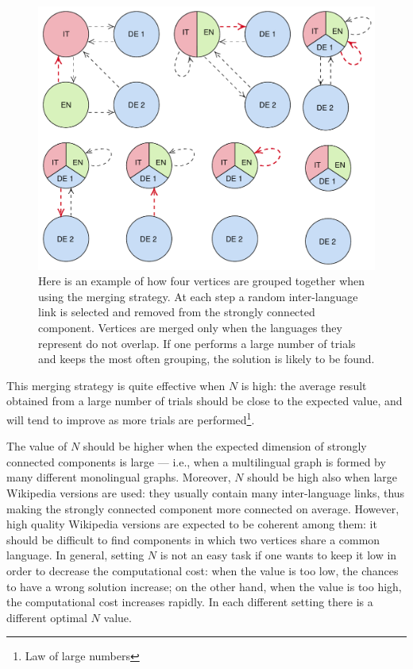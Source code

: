                 \begin{figure}
                    \centering
                    \includegraphics[width=\textwidth]{images/scc_random.pdf}
                    \caption{Here is an example of how four vertices are grouped together when using the  merging strategy. At each step a random inter-language link is selected and removed from the strongly connected component. Vertices are merged only when the languages they represent do not overlap. If one performs a large number of trials and keeps the most often grouping, the  solution is likely to be found.}
                    \label{scc_random}
                \end{figure}
                
                This merging strategy is quite effective when \(N\) is high: the average result obtained from a large number of trials should be close to the expected value, and will tend to improve as more trials are performed\footnote{Law of large numbers}.
                
                The value of \(N\) should be higher when the expected dimension of strongly connected components is large --- i.e., when a multilingual graph is formed by many different monolingual graphs. Moreover, \(N\) should be high also when large Wikipedia versions are used: they usually contain many inter-language links, thus making the strongly connected component more connected on average. However, high quality Wikipedia versions are expected to be coherent among them: it should be difficult to find components in which two vertices share a common language. In general, setting \(N\) is not an easy task if one wants to keep it low in order to decrease the computational cost: when the value is too low, the chances to have a wrong solution increase; on the other hand, when the value is too high, the computational cost increases rapidly. In each different setting there is a different optimal \(N\) value.
                
